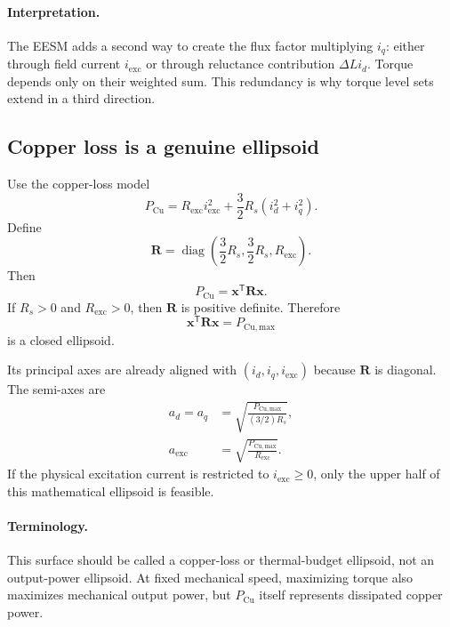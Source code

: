 \documentclass[11pt,a4paper]{article}
\newcommand{\id}{i_d}
\newcommand{\iq}{i_q}
\newcommand{\ie}{i_{\mathrm{exc}}}
\newcommand{\Rs}{R_s}
\newcommand{\Rexc}{R_{\mathrm{exc}}}
\newcommand{\Pmax}{P_{\mathrm{Cu,max}}}
\newcommand{\T}{\mathsf{T}}
\newcommand{\vct}[1]{\bm{#1}}
\newcommand{\mat}[1]{\bm{#1}}
\begin{document}
\paragraph{Interpretation.}
The EESM adds a second way to create the flux factor multiplying $i_q$: either through field current $i_{\mathrm{exc}}$ or through reluctance contribution $\Delta L i_d$. Torque depends only on their weighted sum. This redundancy is why torque level sets extend in a third direction.

\subsection{Copper loss is a genuine ellipsoid}

Use the copper-loss model
\begin{equation}
  P_{\mathrm{Cu}}
  =\Rexc\ie^2+\frac{3}{2}\Rs(\id^2+\iq^2).
  \label{eq:eesm-pcu}
\end{equation}
Define
\begin{equation}
  \mat R=
  \operatorname{diag}\left(
  \frac{3}{2}\Rs,
  \frac{3}{2}\Rs,
  \Rexc
  \right).
\end{equation}
Then
\begin{equation}
  P_{\mathrm{Cu}}=\vct x^\T\mat R\vct x.
\end{equation}
If $\Rs>0$ and $\Rexc>0$, then $\mat R$ is positive definite. Therefore
\begin{equation}
  \boxed{
  \vct x^\T\mat R\vct x=\Pmax
  }
  \label{eq:loss-ellipsoid}
\end{equation}
is a closed ellipsoid.

Its principal axes are already aligned with $(i_d,i_q,i_{\mathrm{exc}})$ because $\mat R$ is diagonal. The semi-axes are
\begin{align}
  a_d=a_q
  &=\sqrt{\frac{\Pmax}{(3/2)\Rs}},\\
  a_{\mathrm{exc}}
  &=\sqrt{\frac{\Pmax}{\Rexc}}.
  \label{eq:loss-axes}
\end{align}
If the physical excitation current is restricted to $\ie\ge0$, only the upper half of this mathematical ellipsoid is feasible.

\paragraph{Terminology.}
This surface should be called a copper-loss or thermal-budget ellipsoid, not an output-power ellipsoid. At fixed mechanical speed, maximizing torque also maximizes mechanical output power, but $P_{\mathrm{Cu}}$ itself represents dissipated copper power.
\end{document}
